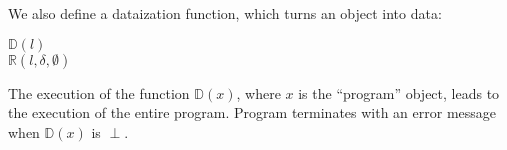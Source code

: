 We also define a dataization function, which turns an object into data:

\begin{algo}
 $\mathbb{D}(l)$ \\
  \tab {} $\mathbb{R}(l, \delta, \emptyset)$ \\
\end{algo}

The execution of the function $\mathbb{D}(x)$, where $x$ is the
``program'' object, leads to the execution of the entire program.
Program terminates with an error message when $\mathbb{D}(x)$ is $\perp$.

\begin{figure*}

\label{fig:is}
\end{figure*}

